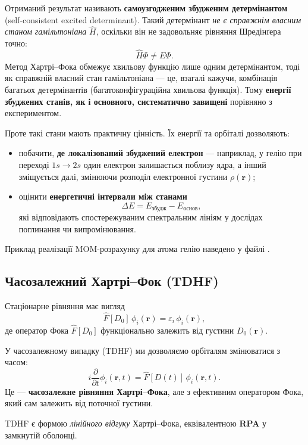 Отриманий результат називають \textbf{самоузгодженим збудженим детермінантом}
(self-consistent excited determinant). Такий детермінант \emph{не є справжнім власним
    станом гамільтоніана} $\hat{H}$, оскільки він не задовольняє рівняння Шредінґера точно:
\[
    \hat{H}\Phi \ne E\Phi.
\]
Метод Хартрі–Фока обмежує хвильову функцію лише одним детермінантом, тоді як
справжній власний стан гамільтоніана --- це, взагалі кажучи, комбінація багатьох
детермінантів (багатоконфігураційна хвильова функція). Тому \textbf{енергії
    збуджених станів, як і основного, систематично завищені} порівняно з експериментом.

Проте такі стани мають практичну цінність. Їх енергії та орбіталі дозволяють:
\begin{itemize}
    \item побачити, \textbf{де локалізований збуджений електрон} --- наприклад, у гелію
          при переході $1s \to 2s$ один електрон залишається поблизу ядра, а інший
          зміщується далі, змінюючи розподіл електронної густини $\rho(\mathbf{r})$;
    \item оцінити \textbf{енергетичні інтервали між станами}
          \[
              \Delta E = E_{\text{збудж}} - E_{\text{основ}},
          \]
          які відповідають спостережуваним спектральним лініям у дослідах поглинання чи випромінювання.
\end{itemize}

Приклад реалізації MOM-розрахунку для атома гелію наведено у файлі
.


\subsection{Часозалежний Хартрі–Фок (TDHF)}

Стаціонарне рівняння має вигляд
\[
    \hat F[D_0]\,\phi_i(\mathbf r)
    = \varepsilon_i\,\phi_i(\mathbf r),
\]
де оператор Фока \(\hat F[D_0]\) функціонально залежить від густини
\(D_0(\mathbf r)\).

У часозалежному випадку (TDHF) ми дозволяємо орбіталям змінюватися з часом:
\[
    i\frac{\partial}{\partial t}\phi_i(\mathbf r,t)
    = \hat F[D(t)]\,\phi_i(\mathbf r,t).
\]
Це --- \textbf{часозалежне рівняння Хартрі–Фока},
але з ефективним оператором Фока, який сам залежить від поточної густини.

TDHF є формою \emph{лінійного відгуку} Хартрі–Фока, еквівалентною \textbf{RPA} у замкнутій оболонці.

